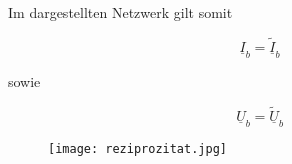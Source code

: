 Im dargestellten Netzwerk gilt somit

\begin{equation}\label{equ:verticImpedance}
    \underline{I}_b =  \underline{\tilde{I}}_b
  \end{equation}
  
sowie 		
  
\begin{equation}\label{equ:verticImpedance}
    \underline{U}_b =  \underline{\widetilde{U}}_b
  \end{equation}
  
  
  
\begin{figure}[H]
\centering
\texttt{[image: reziprozitat.jpg]}
\label{fig:reziprozitat}
\end{figure}
\newpage


